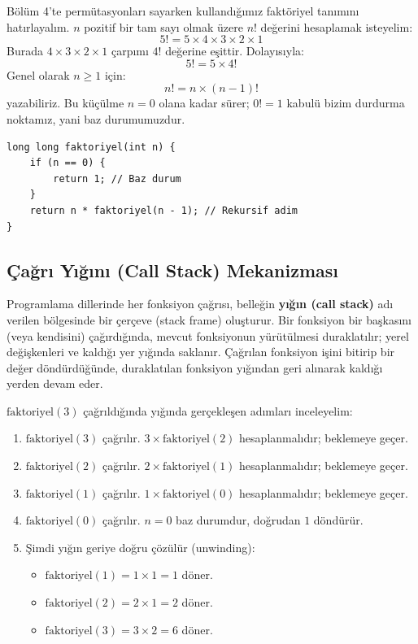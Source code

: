Bölüm 4'te permütasyonları sayarken kullandığımız faktöriyel tanımını hatırlayalım. $n$ pozitif bir tam sayı olmak üzere $n!$ değerini hesaplamak isteyelim:
\[
5! = 5 \times 4 \times 3 \times 2 \times 1
\]
Burada $4 \times 3 \times 2 \times 1$ çarpımı $4!$ değerine eşittir. Dolayısıyla:
\[
5! = 5 \times 4!
\]
Genel olarak $n \ge 1$ için:
\[
n! = n \times (n-1)!
\]
yazabiliriz. Bu küçülme $n=0$ olana kadar sürer; $0! = 1$ kabulü bizim durdurma noktamız, yani baz durumumuzdur.

\begin{lstlisting}[language=CTemel]
long long faktoriyel(int n) {
    if (n == 0) {
        return 1; // Baz durum
    }
    return n * faktoriyel(n - 1); // Rekursif adim
}
\end{lstlisting}

\subsection{Çağrı Yığını (Call Stack) Mekanizması}

Programlama dillerinde her fonksiyon çağrısı, belleğin \textbf{yığın (call stack)} adı verilen bölgesinde bir çerçeve (stack frame) oluşturur. Bir fonksiyon bir başkasını (veya kendisini) çağırdığında, mevcut fonksiyonun yürütülmesi duraklatılır; yerel değişkenleri ve kaldığı yer yığında saklanır. Çağrılan fonksiyon işini bitirip bir değer döndürdüğünde, duraklatılan fonksiyon yığından geri alınarak kaldığı yerden devam eder.

$\text{faktoriyel}(3)$ çağrıldığında yığında gerçekleşen adımları inceleyelim:
\begin{enumerate}
    \item $\text{faktoriyel}(3)$ çağrılır. $3 \times \text{faktoriyel}(2)$ hesaplanmalıdır; beklemeye geçer.
    \item $\text{faktoriyel}(2)$ çağrılır. $2 \times \text{faktoriyel}(1)$ hesaplanmalıdır; beklemeye geçer.
    \item $\text{faktoriyel}(1)$ çağrılır. $1 \times \text{faktoriyel}(0)$ hesaplanmalıdır; beklemeye geçer.
    \item $\text{faktoriyel}(0)$ çağrılır. $n=0$ baz durumdur, doğrudan $1$ döndürür.
    \item Şimdi yığın geriye doğru çözülür (unwinding):
    \begin{itemize}
        \item $\text{faktoriyel}(1) = 1 \times 1 = 1$ döner.
        \item $\text{faktoriyel}(2) = 2 \times 1 = 2$ döner.
        \item $\text{faktoriyel}(3) = 3 \times 2 = 6$ döner.
    \end{itemize}
\end{enumerate}

